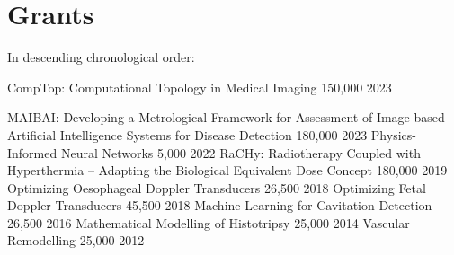 \documentclass[11pt, a4paper]{awesome-cv}
\begin{document}
\hypertarget{grants}{\section{Grants}\label{grants}}

In descending chronological order:

\begin{cvhonorsStretch}
%
\hline 
{}%
{CompTop: Computational Topology in Medical Imaging}%
{\texteuro{}150,000}%
{2023}
%

\hline 
{}%
{MAIBAI: Developing a Metrological Framework for Assessment of Image-based Artificial Intelligence Systems for Disease Detection}%
{\texteuro{}180,000}%
{2023}
%
%
{Physics-Informed Neural Networks }%
{\texteuro{}5,000}%
{2022}
%
%
{RaCHy: Radiotherapy Coupled with Hyperthermia -- Adapting the Biological Equivalent Dose Concept}%
{\textsterling{}180,000}%
{2019}
%
%
{Optimizing Oesophageal Doppler Transducers}%
{\textsterling{}26,500}%
{2018}
%
%
{Optimizing Fetal Doppler Transducers}%
{\textsterling{}45,500}%
{2018}
%
%
{Machine Learning for Cavitation Detection}%
{\textsterling{}26,500}%
{2016}
%
%
{Mathematical Modelling of Histotripsy}%
{\textsterling{}25,000}%
{2014}
%
%
{Vascular Remodelling}%
{\textsterling{}25,000}%
{2012}
%
\end{cvhonorsStretch}

%
%
%
%
%
\end{document}
